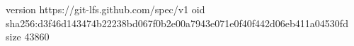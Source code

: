 version https://git-lfs.github.com/spec/v1
oid sha256:d3f46d143474b22238bd067f0b2e00a7943e071e0f40f442d06eb411a04530fd
size 43860
